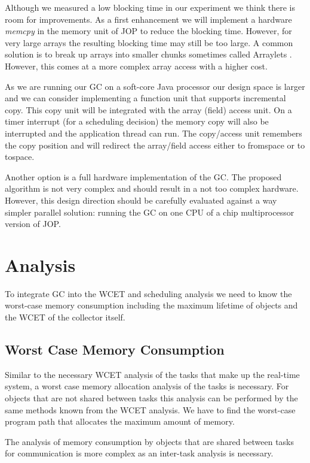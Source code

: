 Although we measured a low blocking time in our experiment we think
there is room for improvements. As a first enhancement we will
implement a hardware \emph{memcpy} in the memory unit of JOP to
reduce the blocking time. However, for very large arrays the
resulting blocking time may still be too large. A common solution is
to break up arrays into smaller chunks sometimes called Arraylets
\cite{gc:bacon03}. However, this comes at a more complex array
access with a higher cost.

As we are running our GC on a soft-core Java processor our design
space is larger and we can consider implementing a function unit
that supports incremental copy. This copy unit will be integrated
with the array (field) access unit. On a timer interrupt (for a
scheduling decision) the memory copy will also be interrupted and
the application thread can run. The copy/access unit remembers the
copy position and will redirect the array/field access either to
fromspace or to tospace.

Another option is a full hardware implementation of the GC. The
proposed algorithm is not very complex and should result in a not
too complex hardware. However, this design direction should be
carefully evaluated against a way simpler parallel solution: running
the GC on one CPU of a chip multiprocessor version of JOP.

\section{Analysis}

To integrate GC into the WCET and scheduling analysis we need to
know the worst-case memory consumption including the maximum
lifetime of objects and the WCET of the collector itself.

\subsection{Worst Case Memory Consumption}

Similar to the necessary WCET analysis of the tasks that make up the
real-time system, a worst case memory allocation analysis of the
tasks is necessary. For objects that are not shared between tasks
this analysis can be performed by the same methods known from the
WCET analysis. We have to find the worst-case program path that
allocates the maximum amount of memory.

The analysis of memory consumption by objects that are shared
between tasks for communication is more complex as an inter-task
analysis is necessary.

